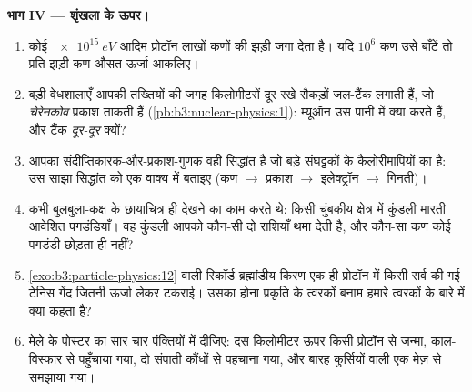 \begin{problem}
\medskip\noindent\textbf{भाग IV --- शृंखला के ऊपर।}

\begin{enumerate}[resume]
  \item कोई $\qty{e15}{eV}$ आदिम प्रोटॉन लाखों कणों की झड़ी जगा
        देता है। यदि $10^{6}$ कण उसे बाँटें तो प्रति झड़ी-कण औसत
        ऊर्जा आकलिए।
  \item बड़ी वेधशालाएँ आपकी तख्तियों की जगह किलोमीटरों दूर रखे
        सैकड़ों जल-टैंक लगाती हैं, जो \emph{चेरेनकोव} प्रकाश
        ताकती हैं (\cref{pb:b3:nuclear-physics:1}):
        म्यूऑन उस पानी में क्या करते हैं, और टैंक \emph{दूर-दूर}
        क्यों?
  \item आपका संदीप्तिकारक-और-प्रकाश-गुणक वही सिद्धांत है जो बड़े
        संघट्टकों के कैलोरीमापियों का है:
        उस साझा सिद्धांत को एक वाक्य में बताइए
        (कण $\to$ प्रकाश $\to$ इलेक्ट्रॉन $\to$ गिनती)।
  \item कभी बुलबुला-कक्ष के छायाचित्र ही देखने का काम करते थे:
        किसी चुंबकीय क्षेत्र में कुंडली मारती आवेशित पगडंडियाँ। वह
        कुंडली आपको कौन-सी दो राशियाँ थमा देती है, और कौन-सा कण
        कोई पगडंडी छोड़ता ही नहीं?
  \item \cref{exo:b3:particle-physics:12} वाली रिकॉर्ड
        ब्रह्मांडीय किरण एक ही प्रोटॉन में किसी सर्व की गई टेनिस
        गेंद जितनी ऊर्जा लेकर टकराई। उसका होना
        प्रकृति के त्वरकों बनाम हमारे त्वरकों के बारे में क्या कहता है?
  \item मेले के पोस्टर का सार चार पंक्तियों में दीजिए: दस
        किलोमीटर ऊपर किसी प्रोटॉन से जन्मा, काल-विस्फार से पहुँचाया
        गया, दो संपाती कौंधों से पहचाना गया, और बारह कुर्सियों वाली
        एक मेज़ से समझाया गया।
\end{enumerate}
\end{problem}
